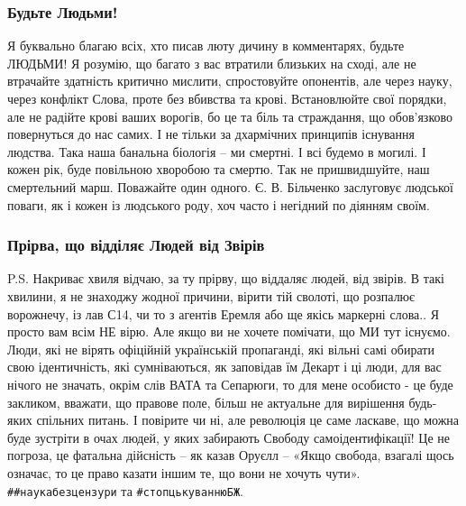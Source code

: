 \subsubsection{Будьте Людьми!}

Я буквально благаю всіх, хто писав люту дичину в комментарях, будьте ЛЮДЬМИ! Я
розумію, що багато з вас втратили близьких на сході, але не втрачайте здатність
критично мислити, спростовуйте опонентів, але через науку, через конфлікт
Слова, проте без вбивства та крові. Встановлюйте свої порядки, але не радійте
крові ваших ворогів, бо це та біль та страждання, що обов’язково повернуться до
нас самих. І не тільки за дхармічних принципів існування людства. Така наша
банальна біологія – ми смертні. І всі будемо в могилі.  І кожен рік, буде
повільною хворобою та смертю. Так не пришвидшуйте, наш смертельний марш.
Поважайте один одного. Є. В. Більченко заслуговує людської поваги, як і кожен із
людського роду, хоч часто і негідний по діянням своїм. 

\subsubsection{Прірва, що відділяє Людей від Звірів}

P.S. Накриває хвиля відчаю, за ту прірву, що віддаляє людей, від звірів. В такі
хвилини, я не знаходжу жодної причини, вірити тій сволоті, що розпалює
ворожнечу, із лав С14, чи то з агентів Еремля або ще якісь маркерні слова.. Я
просто вам всім НЕ вірю. Але якщо ви не хочете помічати, що МИ тут існуємо.
Люди, які не вірять офіційній українській пропаганді, які вільні самі обирати
свою ідентичність, які сумніваються, як заповідав їм Декарт і ці люди, для вас
нічого не значать, окрім слів ВАТА та Сепарюги, то для мене особисто - це буде
закликом, вважати, що правове поле, більш не актуальне для вирішення будь-яких
спільних питань. І повірите чи ні, але революція це саме ласкаве, що можна буде
зустріти в очах людей, у яких забирають Свободу самоідентифікації! Це не
погроза, це фатальна дійсність – як казав Оруєлл – «Якщо свобода, взагалі щось
означає, то це право казати іншим те, що вони не хочуть чути».
\verb|##наукабезцензури| та \verb|#стопцькуваннюБЖ|.



